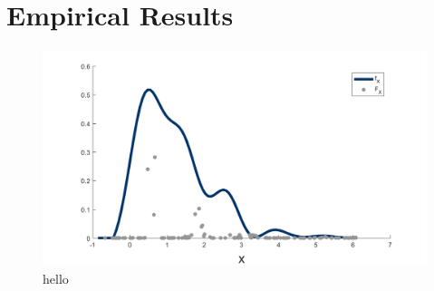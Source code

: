 

\section{Empirical Results}
\label{sec:deconvolution empirical results}

	\begin{figure}
		\centering
		\includegraphics[width = \textwidth]{Figures/Deconvolution/fixed_masses_example.png}
		\caption{hello}
		\label{fig:fixed masses example}
	\end{figure}

